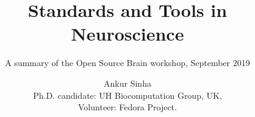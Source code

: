 
\usepackage{xcolor}

\usepackage{tipa}
\usepackage[scale=2]{ccicons}
\usepackage{amssymb}
\usepackage{tikz}
\usetikzlibrary{arrows.meta, arrows, positioning}
\usepackage{jneurosci}
\usepackage{subfig}
\usepackage[T1]{fontenc}
\usepackage[utf8]{inputenc}
\usepackage[style=verbose,backend=biber,autocite=footnote]{biblatex}

\usepackage[default,osfigures,scale=0.95]{opensans}
\usepackage[normalem]{ulem}
\usepackage{hyperref}
\hypersetup{colorlinks,linkcolor=FreedomPurple,urlcolor=FreedomPurple}
\usepackage{graphicx}
\usepackage{algorithmic}
\usepackage{textcomp}
\usepackage{wrapfig}
\usepackage{textgreek}
\usepackage{euler}
\usepackage{ccicons}
\usepackage{pdfpages}


\renewcommand{\figurename}{}


\title[Journal club]{Standards and Tools in Neuroscience}
\subtitle{A summary of the Open Source Brain workshop, September 2019}
\author{Ankur Sinha\\Ph.D. candidate: UH Biocomputation Group, UK,\\Volunteer: Fedora Project.}
\date[]{}


\begin{frame}
  \titlepage{}
\end{frame}

